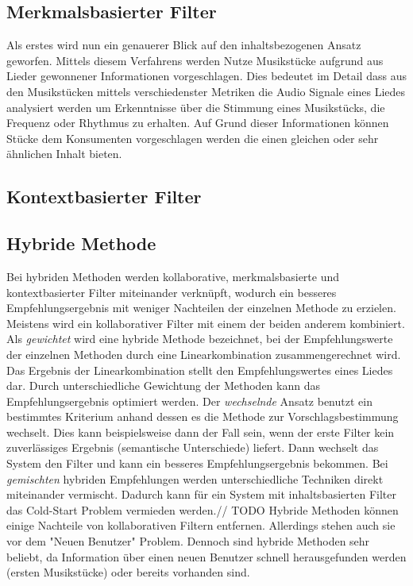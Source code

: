 \documentclass[twosided,a4,10pt]{article}
\begin{document}
\begin{multicols}{2}
		\subsection{Merkmalsbasierter Filter}
		Als erstes wird nun ein genauerer Blick auf den inhaltsbezogenen Ansatz geworfen. Mittels diesem Verfahrens werden Nutze Musikstücke aufgrund aus Lieder gewonnener Informationen vorgeschlagen. Dies bedeutet im Detail dass aus den Musikstücken mittels verschiedenster Metriken die Audio Signale eines Liedes analysiert werden um Erkenntnisse über die Stimmung eines Musikstücks, die Frequenz oder Rhythmus zu erhalten. Auf Grund dieser Informationen können Stücke dem Konsumenten vorgeschlagen werden die einen gleichen oder sehr ähnlichen Inhalt bieten.
		\subsection{Kontextbasierter Filter}

				
		\subsection{Hybride Methode}
		Bei hybriden Methoden werden kollaborative, merkmalsbasierte und kontextbasierter Filter miteinander verknüpft, wodurch ein besseres Empfehlungsergebnis mit weniger Nachteilen der einzelnen Methode zu erzielen. Meistens wird ein kollaborativer Filter mit einem der beiden anderem kombiniert.\newline
		Als \textit{gewichtet} wird eine hybride Methode bezeichnet, bei der Empfehlungswerte der einzelnen Methoden durch eine Linearkombination zusammengerechnet wird. Das Ergebnis der Linearkombination stellt den Empfehlungswertes eines Liedes dar. Durch unterschiedliche Gewichtung der Methoden kann das Empfehlungsergebnis optimiert werden. Der \textit{wechselnde} Ansatz benutzt ein bestimmtes Kriterium anhand dessen es die Methode zur Vorschlagsbestimmung wechselt. Dies kann beispielsweise dann der Fall sein, wenn der erste Filter kein zuverlässiges Ergebnis (semantische Unterschiede) liefert. Dann wechselt das System den Filter und kann ein besseres Empfehlungsergebnis bekommen. Bei \textit{gemischten} hybriden Empfehlungen werden unterschiedliche Techniken direkt miteinander vermischt. Dadurch kann für ein System mit inhaltsbasierten Filter das Cold-Start Problem vermieden werden.\newline // TODO
		Hybride Methoden können einige Nachteile von kollaborativen Filtern entfernen. Allerdings stehen auch sie vor dem "Neuen Benutzer" Problem. Dennoch sind hybride Methoden sehr beliebt, da Information über einen neuen Benutzer schnell herausgefunden werden (ersten Musikstücke) oder bereits vorhanden sind. \cite{burke}
		

\end{multicols}
\end{document}
